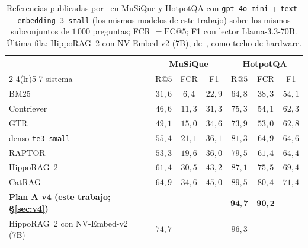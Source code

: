 \documentclass[11pt,a4paper]{article}
\newcommand{\hippo}{HippoRAG~2}
\begin{document}
\begin{table}[t]
\centering\footnotesize\setlength{\tabcolsep}{4pt}
\caption{Referencias publicadas por~\cite{catrag} en MuSiQue y HotpotQA
con \texttt{gpt-4o-mini} + \texttt{text-embedding-3-small} (los mismos
modelos de este trabajo) sobre los mismos subconjuntos de $1\,000$
preguntas; FCR $=\mathrm{FC@}5$; F1 con lector Llama-3.3-70B. Última
fila: \hippo{} con NV-Embed-v2 (7B), de~\cite{hipporag2}, como techo de
hardware.}
\label{tab:otros-datasets}
\begin{tabular}{lcccccc}
\toprule
 & \multicolumn{3}{c}{MuSiQue} & \multicolumn{3}{c}{HotpotQA}\\
\cmidrule(lr){2-4}\cmidrule(lr){5-7}
sistema & $\mathrm{R@}5$ & FCR & F1 & $\mathrm{R@}5$ & FCR & F1\\
\midrule
BM25 & $31{,}6$ & $6{,}4$ & $22{,}9$ & $64{,}8$ & $38{,}3$ & $54{,}1$\\
Contriever & $46{,}6$ & $11{,}3$ & $31{,}3$ & $75{,}3$ & $54{,}1$ & $62{,}3$\\
GTR & $49{,}1$ & $15{,}0$ & $34{,}6$ & $73{,}9$ & $53{,}0$ & $62{,}8$\\
denso \texttt{te3-small} & $55{,}4$ & $21{,}1$ & $36{,}1$ & $81{,}3$ & $64{,}9$ & $64{,}6$\\
RAPTOR & $53{,}3$ & $19{,}6$ & $36{,}0$ & $79{,}5$ & $61{,}4$ & $64{,}4$\\
\hippo{} & $61{,}4$ & $30{,}5$ & $43{,}2$ & $87{,}1$ & $75{,}5$ & $69{,}4$\\
CatRAG & $64{,}9$ & $34{,}6$ & $45{,}0$ & $89{,}5$ & $80{,}4$ & $71{,}4$\\
\textbf{Plan A v4 (este trabajo; \S\ref{sec:v4})} & --- & --- & --- & $\mathbf{94{,}7}$ & $\mathbf{90{,}2}$ & ---\\
\midrule
\hippo{} con NV-Embed-v2 (7B)~\cite{hipporag2} & $74{,}7$ & --- & --- & $96{,}3$ & --- & ---\\
\bottomrule
\end{tabular}
\end{table}
\end{document}

